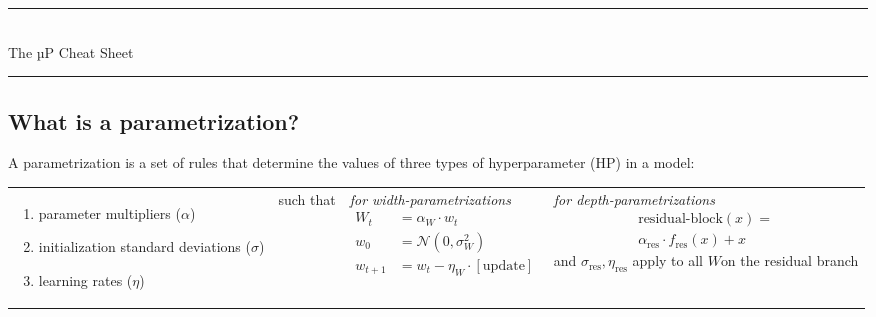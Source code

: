 \documentclass{article}
\begin{document}
\begin{center}
    \rule{20em}{0.001em}
    \\
    \vspace{1.5em}
    {\Large The µP Cheat Sheet}
    \vspace{0.5em}
    \\
    \rule{20em}{0.001em}
    \vspace{-0.5em}
\end{center}

\subsection*{What is a parametrization?}

A parametrization is a set of rules that determine the values of three types of hyperparameter (HP) in a model:

\vspace{1em}
\noindent
\begin{tabular}{@{}p{19em}@{}p{3.5em}p{13em}p{13em}}  %
    \vspace{-1em}
    \begin{enumerate}
        \item parameter multipliers ($\alpha$)
        \item initialization standard deviations ($\sigma$)
        \item learning rates ($\eta$)
    \end{enumerate}
    &
    \centering \vspace{1.4em} such that
    &
    \textit{for width-parametrizations}
    \centering
    \noindent
    {\begin{align*}
        W_t &= \alpha_W \cdot w_t\\
        w_0 &= \mathcal{N}(0, \sigma_W^2)\\
        w_{t+1} &= w_t - \eta_W \cdot [\textrm{update}]
    \end{align*}}
    &
    \textit{for depth-parametrizations}
    \centering
    \noindent
    {\begin{align*}
        \mathrm{residual\text{-}block}(x) =\\
            \alpha_{\mathrm{res}} \cdot f_{\mathrm{res}}(x) + x
    \end{align*}}
    and $\sigma_{\mathrm{res}}, \eta_{\mathrm{res}}$ apply to all $W$on the residual branch
\end{tabular}

\vspace{-0.5em}
\end{document}
